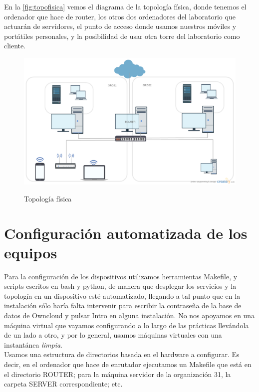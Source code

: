 \documentclass[]{article}
\begin{document}
En la \autoref{fig:topofisica} vemos el diagrama de la topología física, donde tenemos el ordenador que hace de router, los otros dos ordenadores del laboratorio que actuarán de servidores, el punto de acceso donde usamos nuestros móviles y portátiles personales, y la posibilidad de usar otra torre del laboratorio como cliente.


\begin{figure}[h!]
	\caption{Topología física}
	\centering
		\includegraphics[scale=0.35]{images/TopologiaFisica}
	\label{fig:topofisica}
\end{figure}




\section{Configuración automatizada de los equipos}

Para la configuración de los dispositivos utilizamos herramientas Makefile, y scripts escritos en bash y python, de manera que desplegar los servicios y la topología en un dispositivo esté automatizado, llegando a tal punto que en la instalación sólo haría falta intervenir para escribir la contraseña de la base de datos de Owncloud y pulsar Intro en alguna instalación. No nos apoyamos en una máquina virtual que vayamos configurando a lo largo de las prácticas llevándola de un lado a otro, y por lo general, usamos máquinas virtuales con una instantánea \textit{limpia}.
\\

Usamos una estructura de directorios basada en el hardware a configurar. Es decir, en el ordenador que hace de enrutador ejecutamos un Makefile que está en el directorio ROUTER; para la máquina servidor de la organización 31, la carpeta SERVER correspondiente; etc.
\end{document}
